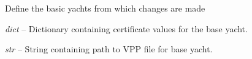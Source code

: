 \documentclass[letterpaper,10pt,english]{sphinxmanual}
\begin{document}
\begin{fulllineitems}
\label{index:IORAnalysis.BaseYacht}
Define the basic yachts from which changes are made

\begin{fulllineitems}
\label{index:IORAnalysis.BaseYacht.cert}
\emph{dict} -- Dictionary containing certificate values for the base yacht.

\end{fulllineitems}


\begin{fulllineitems}
\label{index:IORAnalysis.BaseYacht.VPPFile}
\emph{str} -- String containing path to VPP file for base yacht.

\end{fulllineitems}


\end{fulllineitems}

\end{document}
